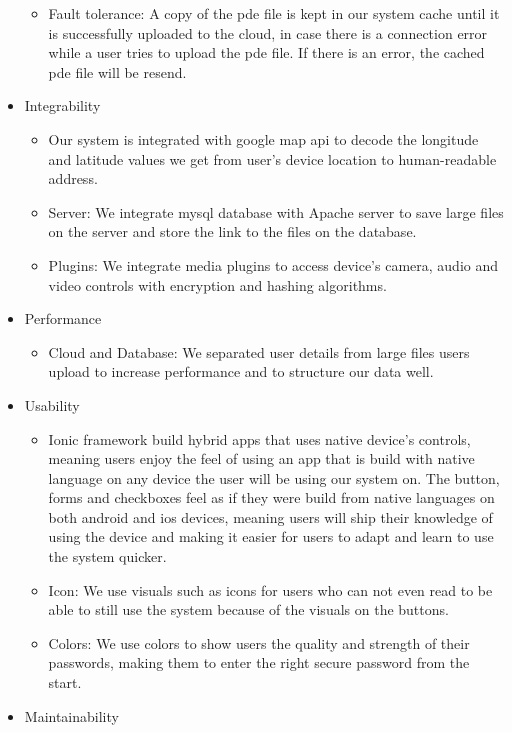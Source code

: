 \documentclass[a4paper,12pt]{article}
\begin{document}
\begin{itemize}
\begin{itemize}
		\item Fault tolerance: A copy of the pde file is kept in our system cache until it is successfully uploaded to the cloud, in case there is a connection error while a user tries to upload the pde file. If there is an error, the cached pde file will be resend.  
	\end{itemize}
\item Integrability
	\begin{itemize}
		\item Our system is integrated with google map api to decode the longitude and latitude values we get from user's device location to human-readable address.
		\item Server: We integrate mysql database with Apache server to save large files on the server and store the link to the files on the database.
		\item Plugins: We integrate media plugins to access device's camera, audio and video controls with encryption and hashing algorithms. 
	\end{itemize}
\item Performance
	\begin{itemize}
		\item Cloud and Database: We separated user details from large files users upload to increase performance and to structure our data well.
	\end{itemize}
\item Usability
	\begin{itemize}
		\item Ionic framework build hybrid apps that uses native device's controls, meaning users enjoy the feel of using an app that is build with native language on any device the user will be using our system on. The button, forms and checkboxes feel as if they were build from native languages on both android and ios devices, meaning users will ship their knowledge of using the device and making it easier for users to adapt and learn to use the system quicker.
		\item Icon: We use visuals such as icons for users who can not even read to be able to still use the system because of the visuals on the buttons.
		\item Colors: We use colors to show users the quality and strength of their passwords, making them to enter the right secure password from the start.
	\end{itemize}
\item Maintainability
	\begin{itemize}

\end{itemize}
\end{itemize}
\end{document}
